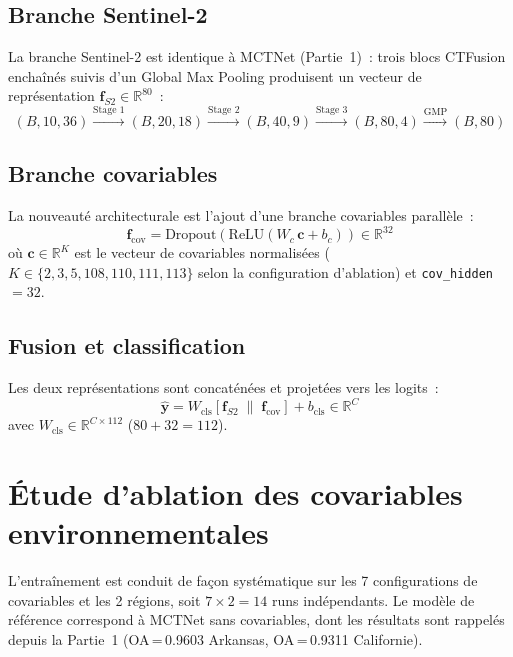 \subsection{Branche Sentinel-2}

La branche Sentinel-2 est identique à MCTNet (Partie~1)~: trois blocs CTFusion
enchaînés suivis d'un Global Max Pooling produisent un vecteur de représentation
$\mathbf{f}_{S2} \in \mathbb{R}^{80}$~:
\[
    (B, 10, 36)
    \xrightarrow{\text{Stage 1}} (B, 20, 18)
    \xrightarrow{\text{Stage 2}} (B, 40, 9)
    \xrightarrow{\text{Stage 3}} (B, 80, 4)
    \xrightarrow{\text{GMP}} (B, 80)
\]

\subsection{Branche covariables}

La nouveauté architecturale est l'ajout d'une branche covariables parallèle~:
\[
    \mathbf{f}_{\text{cov}} =
    \text{Dropout}\!\left(\text{ReLU}\!\left(W_c\,\mathbf{c} + b_c\right)\right)
    \in \mathbb{R}^{32}
\]
où $\mathbf{c} \in \mathbb{R}^{K}$ est le vecteur de covariables normalisées
($K \in \{2, 3, 5, 108, 110, 111, 113\}$ selon la configuration d'ablation) et
\texttt{cov\_hidden} $= 32$.

\subsection{Fusion et classification}

Les deux représentations sont concaténées et projetées vers les logits~:
\[
    \hat{\mathbf{y}} = W_{\text{cls}}\!\left[\mathbf{f}_{S2} \;\|\;
    \mathbf{f}_{\text{cov}}\right] + b_{\text{cls}} \in \mathbb{R}^{C}
\]
avec $W_{\text{cls}} \in \mathbb{R}^{C \times 112}$ ($80 + 32 = 112$).

\section{Étude d'ablation des covariables environnementales}

L'entraînement est conduit de façon systématique sur les 7 configurations de
covariables et les 2 régions, soit $7 \times 2 = 14$ runs indépendants. Le modèle
de référence correspond à MCTNet sans covariables, dont les résultats sont rappelés
depuis la Partie~1 (OA\,=\,0.9603 Arkansas, OA\,=\,0.9311 Californie).

